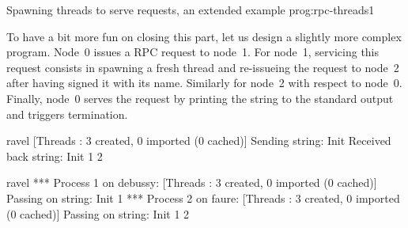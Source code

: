  {Spawning threads to serve
  requests, an extended example} {prog:rpc-threads1}

To have a bit more fun on closing this part, let us design a slightly
more complex program. Node~0 issues a RPC request to node~1. For
node~1, servicing this request consists in spawning a fresh thread and
re-issueing the request to node~2 after having signed it with its
name.  Similarly for node~2 with respect to node~0. Finally, node~0
serves the request by printing the string to the standard output and
triggers termination.

\begin{shell}
ravel%
[Threads : 3 created, 0 imported (0 cached)]
Sending string: Init
Received back string: Init 1 2

ravel%
*** Process 1 on debussy:
[Threads : 3 created, 0 imported (0 cached)]
Passing on string: Init 1
*** Process 2 on faure:
[Threads : 3 created, 0 imported (0 cached)]
Passing on string: Init 1 2
\end{shell}

